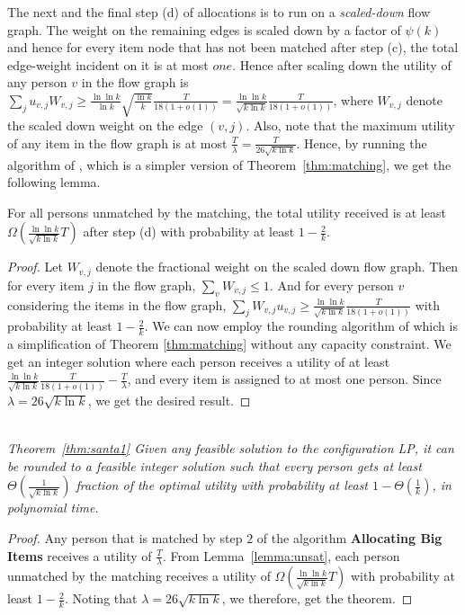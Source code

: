 The next and the final step (d) of allocations is to run \cite{dani:05} on a {\em scaled-down} flow graph. 
The weight on the remaining edges is scaled down by a factor of $\psi(k)$ and hence
for every item node that has not been matched after step (c), the total edge-weight incident on it is at most $one$. Hence after scaling down the utility of any person $v$ in the flow graph is
$\sum_{j} u_{v,j} W_{v,j} \geq \frac{\ln{\ln{k}}}{\ln{k}}\sqrt{\frac{\ln{k}}{k}}\frac{T}{18(1+o(1))}=
\frac{\ln{\ln{k}}}{\sqrt{k\ln{k}}}\frac{T}{18(1+o(1))}$, where $W_{v,j}$ denote the scaled down weight on the edge $(v,j)$. Also, note that the maximum utility of any item in the flow graph is at most $\frac{T}{\lambda}=\frac{T}{26\sqrt{k\ln{k}}}$. Hence, by running the algorithm of \cite{dani:05}, which is a simpler version of Theorem~\ref{thm:matching}, we get the following lemma.







\begin{lemma}
\label{lemma:unsat}
For all persons unmatched by the matching, the total utility received is at least $\Omega(\frac{\ln{\ln{k}}}{\sqrt{k\ln{k}}}T)$ after step (d) with probability at least $1-\frac{2}{k}$.
\end{lemma}
 \begin{proof}
 Let $W_{v,j}$ denote the fractional weight on the scaled down flow graph. Then for every item $j$ in the flow graph, $\sum_{v} W_{v,j} \leq 1$. And for every person $v$ considering the items in the flow graph, $\sum_{j} W_{v,j} u_{v,j} \geq \frac{\ln{\ln{k}}}{\sqrt{k\ln{k}}}\frac{T}{18(1+o(1))}$ with probability at least $1-\frac{2}{k}$. We can now employ the rounding algorithm of \cite{dani:05} which is a simplification of Theorem \ref{thm:matching} without any capacity constraint. We get an integer solution where each person receives a utility of at least $\frac{\ln{\ln{k}}}{\sqrt{k\ln{k}}}\frac{T}{18(1+o(1))}-\frac{T}{\lambda}$, and every item is assigned to at most one person. Since $\lambda = 26\sqrt{k\ln{k}}$, we get the desired result.
\end{proof}
~\\
{\it Theorem~\ref{thm:santa1}
Given any feasible solution to the configuration LP, it can be rounded to a feasible integer solution such that every person gets  at least $\Theta\left(\frac{1}{\sqrt{k\ln{k}}}\right)$ fraction of the optimal utility with probability at least $1-\Theta(\frac{1}{k})$, in polynomial time.
}
\begin{proof}
Any person that is matched by step $2$ of the algorithm {\bf Allocating Big Items} receives a utility of $\frac{T}{\lambda}$. From Lemma~\ref{lemma:unsat}, each person unmatched by the matching receives a utility of $\Omega(\frac{\ln{\ln{k}}}{\sqrt{k\ln{k}}}T)$ with probability at least $1-\frac{2}{k}$. Noting that $\lambda=26\sqrt{k\ln{k}}$, we therefore, get the theorem.
\end{proof}

